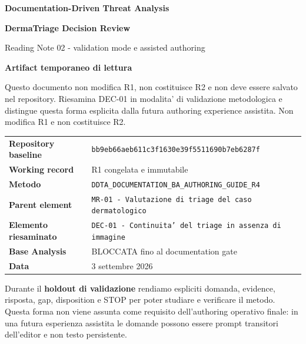 \documentclass[11pt,a4paper]{article}
\begin{document}

\begin{titlepage}
\thispagestyle{empty}
\vspace*{9mm}
{\sffamily\bfseries\color{DDTANavy}\fontsize{15}{18}\selectfont Documentation-Driven Threat Analysis}\par
\vspace{5mm}
{\sffamily\bfseries\color{DDTANavy}\fontsize{28}{32}\selectfont DermaTriage Decision Review}\par
\vspace{2mm}
{\sffamily\color{DDTABlue}\fontsize{18}{22}\selectfont Reading Note 02 - validation mode e assisted authoring}\par

\vspace{10mm}
\begin{tcolorbox}[enhanced,arc=3pt,boxrule=0pt,colback=DDTANavy,left=12pt,right=12pt,top=11pt,bottom=11pt]
{\color{white}\sffamily\bfseries\large Artifact temporaneo di lettura}\par
\vspace{2mm}
{\color{white!88}\small Questo documento non modifica R1, non costituisce R2 e non deve essere salvato nel repository. Riesamina DEC-01 in modalita' di validazione metodologica e distingue questa forma esplicita dalla futura authoring experience assistita. Non modifica R1 e non costituisce R2.}
\end{tcolorbox}

\vspace{8mm}
\begin{tabularx}{\textwidth}{L{45mm}Y}
\toprule
\textbf{Repository baseline} & \texttt{bb9eb66aeb611c3f1630e39f5511690b7eb6287f} \\
\textbf{Working record} & R1 congelata e immutabile \\
\textbf{Metodo} & \texttt{DDTA\_DOCUMENTATION\_BA\_AUTHORING\_GUIDE\_R4} \\
\textbf{Parent element} & \texttt{MR-01 - Valutazione di triage del caso dermatologico} \\
\textbf{Elemento riesaminato} & \texttt{DEC-01 - Continuita' del triage in assenza di immagine} \\
\textbf{Base Analysis} & BLOCCATA fino al documentation gate \\
\textbf{Data} & 3 settembre 2026 \\
\bottomrule
\end{tabularx}

\vfill
\begin{ddtaprinciple}[title={Regola per questa fase}]
Durante il \textbf{holdout di validazione} rendiamo espliciti domanda, evidence, risposta, gap, disposition e STOP per poter studiare e verificare il metodo. Questa forma non viene assunta come requisito dell'authoring operativo finale: in una futura esperienza assistita le domande possono essere prompt transitori dell'editor e non testo persistente.
\end{ddtaprinciple}
\end{titlepage}
\end{document}
